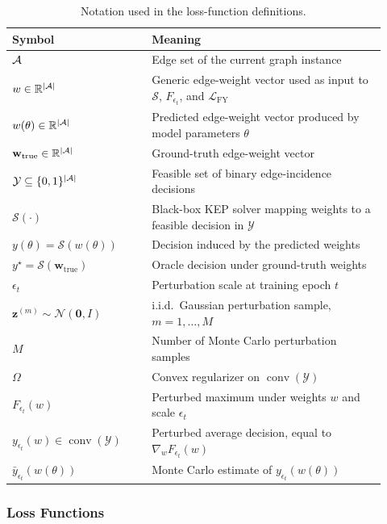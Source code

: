 \documentclass{article}
\begin{document}
\begin{table}[H]
\centering
\caption{Notation used in the loss-function definitions.}
\label{tab:loss-notation}
\begin{tabular}{@{}p{0.34\linewidth}p{0.58\linewidth}@{}}
\toprule
\textbf{Symbol} & \textbf{Meaning} \\
\midrule
\(\mathcal{A}\) & Edge set of the current graph instance \\
\(w\in\mathbb{R}^{|\mathcal{A}|}\) & Generic edge-weight vector used as input to \(\mathcal{S}\), \(F_{\epsilon_t}\), and \(\mathcal{L}_{\mathrm{FY}}\) \\
\(w(\theta)\in\mathbb{R}^{|\mathcal{A}|}\) & Predicted edge-weight vector produced by model parameters \(\theta\) \\
\(\mathbf w_{\mathrm{true}}\in\mathbb{R}^{|\mathcal{A}|}\) & Ground-truth edge-weight vector \\
\(\mathcal{Y}\subseteq\{0,1\}^{|\mathcal{A}|}\) & Feasible set of binary edge-incidence decisions \\
\(\mathcal{S}(\cdot)\) & Black-box KEP solver mapping weights to a feasible decision in \(\mathcal{Y}\) \\
\(y(\theta)=\mathcal{S}(w(\theta))\) & Decision induced by the predicted weights \\
\(y^\star=\mathcal{S}(\mathbf w_{\mathrm{true}})\) & Oracle decision under ground-truth weights \\
\(\epsilon_t\) & Perturbation scale at training epoch \(t\) \\
\(\mathbf z^{(m)}\sim\mathcal{N}(\mathbf 0,I)\) & i.i.d.\ Gaussian perturbation sample, \(m=1,\dots,M\) \\
\(M\) & Number of Monte Carlo perturbation samples \\
\(\Omega\) & Convex regularizer on \(\operatorname{conv}(\mathcal{Y})\) \\
\(F_{\epsilon_t}(w)\) & Perturbed maximum under weights \(w\) and scale \(\epsilon_t\) \\
\(y_{\epsilon_t}(w)\in\operatorname{conv}(\mathcal{Y})\) & Perturbed average decision, equal to \(\nabla_w F_{\epsilon_t}(w)\) \\
\(\bar{y}_{\epsilon_t}(w(\theta))\) & Monte Carlo estimate of \(y_{\epsilon_t}(w(\theta))\) \\
\bottomrule
\end{tabular}
\end{table}

\subsubsection{Loss Functions}
\end{document}
